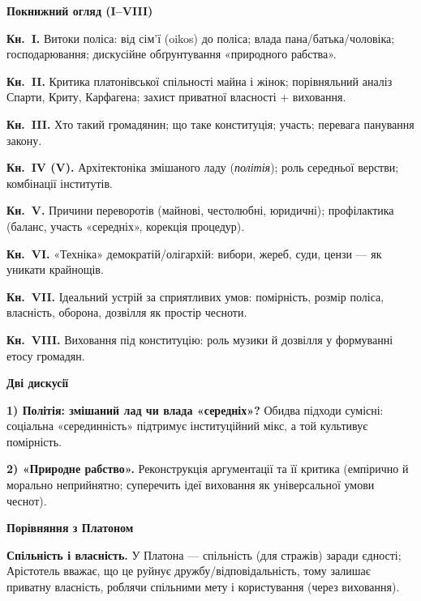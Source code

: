 \documentclass[12pt,a4paper]{article}
\begin{document}
\vspace{0.6em}
\begin{center}\textbf{\large Покнижний огляд (I–VIII)}\end{center}

\textbf{Кн.~I.} Витоки поліса: від сім’ї (oikos) до поліса; влада пана/батька/чоловіка; господарювання; дискусійне обґрунтування «природного рабства».

\textbf{Кн.~II.} Критика платонівської спільності майна і жінок; порівняльний аналіз Спарти, Криту, Карфагена; захист приватної власності + виховання.

\textbf{Кн.~III.} Хто такий громадянин; що таке конституція; участь; перевага панування закону.

\textbf{Кн.~IV (V).} Архітектоніка змішаного ладу (\textit{політія}); роль середньої верстви; комбінації інститутів.

\textbf{Кн.~V.} Причини переворотів (майнові, честолюбні, юридичні); профілактика (баланс, участь «середніх», корекція процедур).

\textbf{Кн.~VI.} «Техніка» демократій/олігархій: вибори, жереб, суди, цензи — як уникати крайнощів.

\textbf{Кн.~VII.} Ідеальний устрій за сприятливих умов: помірність, розмір поліса, власність, оборона, дозвілля як простір чесноти.

\textbf{Кн.~VIII.} Виховання під конституцію: роль музики й дозвілля у формуванні етосу громадян.

\vspace{0.8em}
\begin{center}\textbf{\large Дві дискусії}\end{center}

\textbf{1) Політія: змішаний лад чи влада «середніх»?} Обидва підходи сумісні: соціальна «серединність» підтримує інституційний мікс, а той культивує помірність.

\textbf{2) «Природне рабство».} Реконструкція аргументації та її критика (емпірично й морально неприйнятно; суперечить ідеї виховання як універсальної умови чеснот).

\vspace{0.8em}
\begin{center}\textbf{\large Порівняння з Платоном}\end{center}

\textbf{Спільність і власність.} У Платона — спільність (для стражів) заради єдності; Арістотель вважає, що це руйнує дружбу/відповідальність, тому залишає приватну власність, роблячи спільними мету і користування (через виховання).
\end{document}

